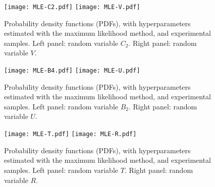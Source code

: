 \begin{figure}[ht!]
    \begin{center}
        \texttt{[image: MLE-C2.pdf]} \texttt{[image: MLE-V.pdf]}
    \end{center}
    \caption[Probability density functions (PDFs) of $C_2$ and $V$.]{Probability density functions (PDFs), with hyperparameters estimated with the maximum likelihood method, and experimental samples. Left panel: random variable $C_2$. Right panel: random variable $V$.}
    \label{fig:MLE-Set-1}
\end{figure}
\begin{figure}[ht!]
    \begin{center}
        \texttt{[image: MLE-B4.pdf]} \texttt{[image: MLE-U.pdf]}
    \end{center}
    \caption[Probability density functions (PDFs) of $B_2$ and $U$.]{Probability density functions (PDFs), with hyperparameters estimated with the maximum likelihood method, and experimental samples. Left panel: random variable $B_2$. Right panel: random variable $U$.}
    \label{fig:MLE-Set-2}
\end{figure}
\begin{figure}[ht!]
    \begin{center}
        \texttt{[image: MLE-T.pdf]} \texttt{[image: MLE-R.pdf]}
    \end{center}
    \caption[Probability density functions (PDFs) of $T$ and $R$.]{Probability density functions (PDFs), with hyperparameters estimated with the maximum likelihood method, and experimental samples. Left panel: random variable $T$. Right panel: random variable $R$.}
    \label{fig:MLE-Set-3}
\end{figure}

